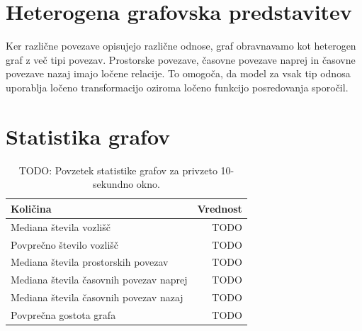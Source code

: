 \section{Heterogena grafovska predstavitev}
\label{subsec:heterogeni-graf}

Ker različne povezave opisujejo različne odnose, graf obravnavamo kot heterogen graf z več tipi povezav.
Prostorske povezave, časovne povezave naprej in časovne povezave nazaj imajo ločene relacije.
To omogoča, da model za vsak tip odnosa uporablja ločeno transformacijo oziroma ločeno funkcijo posredovanja sporočil.

\section{Statistika grafov}
\label{subsec:statistika-grafov}

\begin{table}[H]
    \centering
    \caption{TODO: Povzetek statistike grafov za privzeto 10-sekundno okno.}
    \label{tab:graph-statistics}
    \begin{tabular}{lr}
        \toprule
        Količina & Vrednost \\
        \midrule
        Mediana števila vozlišč & TODO \\
        Povprečno število vozlišč & TODO \\
        Mediana števila prostorskih povezav & TODO \\
        Mediana števila časovnih povezav naprej & TODO \\
        Mediana števila časovnih povezav nazaj & TODO \\
        Povprečna gostota grafa & TODO \\
        \bottomrule
    \end{tabular}
\end{table}

